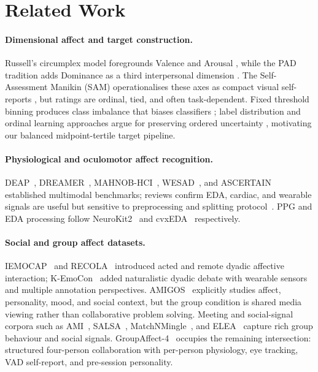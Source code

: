 \documentclass[sigconf,review,anonymous]{acmart}
\begin{document}
\begin{sloppypar}
\section{Related Work}
\label{sec:related}

\paragraph{Dimensional affect and target construction.}
Russell's circumplex model foregrounds Valence and Arousal
\cite{russell1980circumplex}, while the PAD tradition adds Dominance as a
third interpersonal dimension \cite{mehrabian1996pleasure}.
The Self-Assessment Manikin (SAM) operationalises these axes as compact
visual self-reports \cite{bradley1994sam}, but ratings are ordinal, tied,
and often task-dependent.
Fixed threshold binning produces class imbalance that biases classifiers
\cite{he2009imbalanced,johnson2019classimbalance}; label distribution and
ordinal learning approaches argue for preserving ordered uncertainty
\cite{geng2016label,wen2023ordinal}, motivating our balanced
midpoint-tertile target pipeline.

\paragraph{Physiological and oculomotor affect recognition.}
DEAP~\cite{koelstra2012deap}, DREAMER~\cite{katsigiannis2018dreamer},
MAHNOB-HCI~\cite{soleymani2012mahnob}, WESAD~\cite{schmidt2018wesad},
and ASCERTAIN~\cite{subramanian2018ascertain} established multimodal
benchmarks; reviews confirm EDA, cardiac, and wearable signals are
useful but sensitive to preprocessing and splitting
protocol~\cite{shu2018review,ahmad2022survey,kreibig2010autonomic}.
PPG and EDA processing follow NeuroKit2~\cite{makowski2021neurokit2} and
cvxEDA~\cite{greco2016cvxeda} respectively.

\paragraph{Social and group affect datasets.}
IEMOCAP~\cite{busso2008iemocap} and RECOLA~\cite{ringeval2013introducing}
introduced acted and remote dyadic affective interaction;
K-EmoCon~\cite{park2020kemocon} added naturalistic dyadic debate with
wearable sensors and multiple annotation perspectives.
AMIGOS~\cite{mirandacorrea2021amigos} explicitly studies affect, personality,
mood, and social context, but the group condition is shared media viewing
rather than collaborative problem solving.
Meeting and social-signal corpora such as AMI~\cite{mccowan2005ami},
SALSA~\cite{alameda2015salsa}, MatchNMingle~\cite{cabrera2018matchnmingle},
and ELEA~\cite{sanchez2012emergent} capture rich group behaviour and
social signals.
GroupAffect-4~\cite{groupaffect4} occupies the remaining intersection:
structured four-person collaboration with per-person physiology, eye
tracking, VAD self-report, and pre-session personality.


\end{sloppypar}
\end{document}
